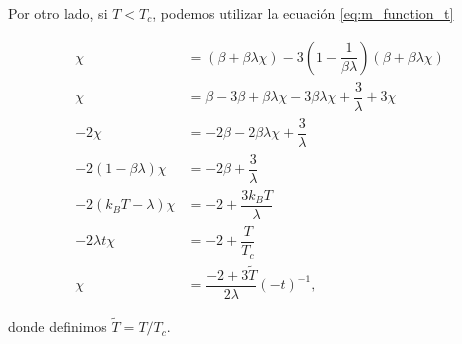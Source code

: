 \documentclass[10pt]{article}
\begin{document}
Por otro lado, si $T < T_c$, podemos utilizar la ecuaci\'on \ref{eq:m_function_t}

\begin{align}
\chi &= (\beta + \beta \lambda \chi) - 3 \left( 1 - \dfrac{1}{\beta \lambda} \right)(\beta + \beta \lambda \chi) \nonumber \\
\chi &= \beta - 3\beta  + \beta \lambda \chi - 3 \beta \lambda \chi + \dfrac{3}{\lambda} + 3\chi \nonumber \\
-2 \chi &= -2 \beta - 2\beta \lambda \chi + \dfrac{3}{\lambda} \nonumber \\
-2(1 - \beta \lambda ) \chi &= -2 \beta  + \dfrac{3}{\lambda} \nonumber \\
-2(k_B T -  \lambda ) \chi &= -2   + \dfrac{3k_B T}{\lambda} \nonumber \\
-2\lambda t \chi &= -2   + \dfrac{T}{T_c} \nonumber \\
\chi &= \dfrac{-2 + 3\tilde{T}}{2\lambda} (-t)^{-1},
\end{align}

donde definimos $\tilde{T} = T/T_c$. 
\end{document}

